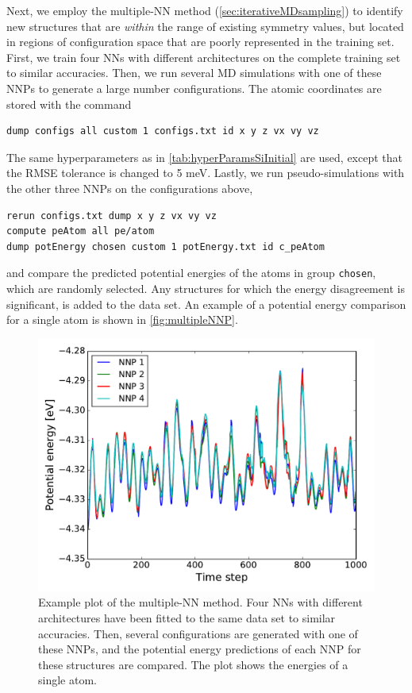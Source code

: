 \documentclass[twoside,english]{uiofysmaster}
\begin{document}
Next, we employ the multiple-NN method (\autoref{sec:iterativeMDsampling}) to identify new structures 
that are \textit{within} the range of existing symmetry values, but located in regions of configuration space 
that are poorly represented in the training set. First, we train four NNs with different architectures on 
the complete training set to similar accuracies. 
Then, we run several MD simulations with one of these NNPs
to generate a large number configurations. The atomic coordinates are stored with the command
\begin{lstlisting}[style=lammps]
dump configs all custom 1 configs.txt id x y z vx vy vz
\end{lstlisting}
The same hyperparameters as in \autoref{tab:hyperParamsSiInitial} are used, 
except that the RMSE tolerance is changed to 5 meV. Lastly, we run pseudo-simulations with the other three NNPs
on the configurations above, 
\begin{lstlisting}[style=lammps]
rerun configs.txt dump x y z vx vy vz
compute peAtom all pe/atom
dump potEnergy chosen custom 1 potEnergy.txt id c_peAtom
\end{lstlisting}
and compare the predicted potential energies of the atoms in group \texttt{chosen}, which are randomly selected. 
Any structures for which the energy disagreement is significant, is added to the data set. An example of a 
potential energy comparison for a single atom is shown in \autoref{fig:multipleNNP}. 
\begin{figure}
\centering
  \includegraphics[width = 0.7\linewidth]{Figures/Results/multipleNNP.pdf}
  \caption{Example plot of the multiple-NN method. Four NNs with different architectures have been fitted to the same 
           data set to similar accuracies. Then, several configurations are generated with one of these NNPs, and 
           the potential energy predictions of each NNP for these structures are compared. The plot shows 
           the energies of a single atom.}
  \label{fig:multipleNNP}
\end{figure}
\end{document}
